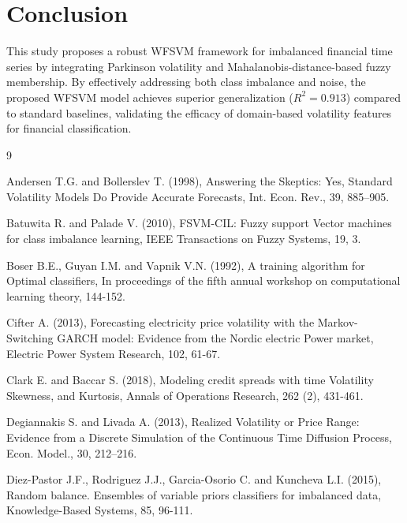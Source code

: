 \documentclass[twoside]{article}
\begin{document}
	\section*{Conclusion}
	This study proposes a robust WFSVM framework for imbalanced financial time series by integrating Parkinson volatility and Mahalanobis-distance-based fuzzy membership. By effectively addressing both class imbalance and noise, the proposed WFSVM model achieves superior generalization ($R^2=0.913$) compared to standard baselines, validating the efficacy of domain-based volatility features for financial classification.
	
\begin{thebibliography}{9}
	
	Andersen T.G. and Bollerslev T. (1998), Answering the Skeptics: Yes, Standard Volatility Models Do Provide Accurate Forecasts, Int. Econ. Rev., 39, 885--905.
	
	Batuwita R. and Palade V. (2010), FSVM-CIL: Fuzzy support Vector machines for class imbalance learning, IEEE Transactions on Fuzzy Systems, 19, 3.
	
	Boser B.E., Guyan I.M. and Vapnik V.N. (1992), A training algorithm for Optimal classifiers, In proceedings of the fifth annual workshop on computational learning theory, 144-152.
	
	Cifter A. (2013), Forecasting electricity price volatility with the Markov-Switching GARCH model: Evidence from the Nordic electric Power market, Electric Power System Research, 102, 61-67.
	
	Clark E. and Baccar S. (2018), Modeling credit spreads with time Volatility Skewness, and Kurtosis, Annals of Operations Research, 262 (2), 431-461.
	
	Degiannakis S. and Livada A. (2013), Realized Volatility or Price Range: Evidence from a Discrete Simulation of the Continuous Time Diffusion Process, Econ. Model., 30, 212--216.
	
	Diez-Pastor J.F., Rodriguez J.J., Garcia-Osorio C. and Kuncheva L.I. (2015), Random balance. Ensembles of variable priors classifiers for imbalanced data, Knowledge-Based Systems, 85, 96-111.
	

\end{thebibliography}
\end{document}
